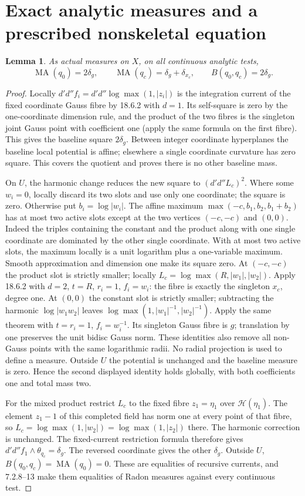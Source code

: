 \documentclass[11pt]{article}
\newtheorem{lemma}[theorem]{Lemma}
\newcommand{\DD}{d'd''}
\newcommand{\MA}{\operatorname{MA}}
\begin{document}
\section{Exact analytic measures and a prescribed nonskeletal equation}
\begin{lemma}\label{newns:products}
As actual measures on $X$, on all continuous analytic tests,
\[
 \MA(q_0)=2\delta_g,\qquad
 \MA(q_c)=\delta_g+\delta_{x_c},\qquad
 B(q_0,q_c)=2\delta_g.
\]
\end{lemma}
\begin{proof}
Locally $\DD f_i=\DD\log\max(1,|z_i|)$ is the integration
current of the fixed coordinate Gauss fibre by 18.6.2 with $d=1$.
Its self-square is zero by the one-coordinate dimension rule, and the
product of the two fibres is the singleton joint Gauss point with
coefficient one (apply the same formula on the first fibre).
This gives the baseline square $2\delta_g$. Between integer coordinate
hyperplanes the baseline local potential is affine; elsewhere a single
coordinate curvature has zero square. This covers the quotient and
proves there is no other baseline mass.

On $U$, the harmonic change reduces the new square to $(\DD L_c)^2$.
Where some $w_i=0$, locally discard its two slots and use only one
coordinate; the square is zero. Otherwise put $b_i=\log|w_i|$.
The affine maximum $\max(-c,b_1,b_2,b_1+b_2)$ has at most two
active slots except at the two vertices $(-c,-c)$ and $(0,0)$.
Indeed the triples containing the constant and the product along with
one single coordinate are dominated by the other single coordinate.
With at most two active slots, the maximum locally is a unit logarithm
plus a one-variable maximum. Smooth approximation and dimension one
make its square zero. At $(-c,-c)$ the product slot is strictly smaller;
locally $L_c=\log\max(R,|w_1|,|w_2|)$.
Apply 18.6.2 with $d=2$, $t=R$, $r_i=1$, $f_i=w_i$:
the fibre is exactly the singleton $x_c$, degree one.
At $(0,0)$ the constant slot is strictly smaller; subtracting
the harmonic $\log|w_1w_2|$ leaves
$\log\max(1,|w_1|^{-1},|w_2|^{-1})$.
Apply the same theorem with $t=r_i=1$, $f_i=w_i^{-1}$.
Its singleton Gauss fibre is $g$; translation by one preserves the
unit bidisc Gauss norm. These identities also remove all non-Gauss
points with the same logarithmic radii. No radial projection is used
to define a measure. Outside $U$ the potential is unchanged and the
baseline measure is zero. Hence the second displayed identity holds
globally, with both coefficients one and total mass two.

For the mixed product restrict $L_c$ to the fixed fibre
$z_1=\eta_1$ over $\mathscr H(\eta_1)$. The element $z_1-1$ of
this completed field has norm one at every point of that fibre, so
$L_c=\log\max(1,|w_2|)=\log\max(1,|z_2|)$ there.
The harmonic correction is unchanged. The fixed-current restriction
formula therefore gives $\DD f_1\wedge\theta_{q_c}=\delta_g$.
The reversed coordinate gives the other $\delta_g$.
Outside $U$, $B(q_0,q_c)=\MA(q_0)=0$.
These are equalities of recursive currents, and 7.2.8--13 make them
equalities of Radon measures against every continuous test.
\end{proof}
\end{document}
